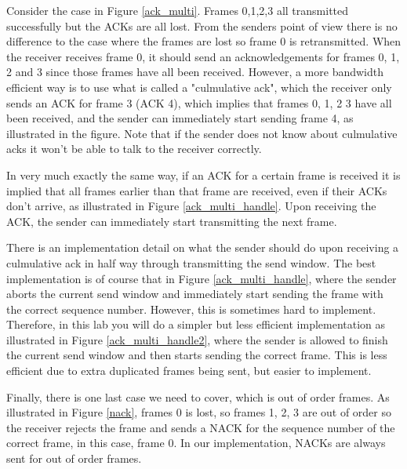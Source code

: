 \documentclass[11pt]{article}
\begin{document}
Consider the case in Figure \ref{ack_multi}. Frames 0,1,2,3 all transmitted successfully but the ACKs are all lost. From the senders point of view there is no difference to the case where the frames
are lost so frame 0 is retransmitted. When the receiver receives frame 0, it should send an acknowledgements for frames 0, 1, 2 and 3 since those frames have all been received. However, a more 
bandwidth efficient way is to use what is called a "culmulative ack", which the receiver only sends an ACK for frame 3 (ACK 4), which implies that frames 0, 1, 2 3 have all been received, and the sender
can immediately start sending frame 4, as illustrated in the figure. Note that if the sender does not know about culmulative acks it won't be able to talk to the receiver correctly.

In very much exactly the same way, if an ACK for a certain frame is received it is implied that all frames earlier than that frame are received, even if their ACKs don't arrive, as illustrated in Figure
\ref{ack_multi_handle}. Upon receiving the ACK, the sender can immediately start transmitting the next frame.

There is an implementation detail on what the sender should do upon receiving a culmulative ack in half way through transmitting the send window. The best implementation is of course that in Figure \ref{ack_multi_handle}, where
the sender aborts the current send window and immediately start sending the frame with the correct sequence number. However, this is sometimes hard to implement. Therefore, in this lab you will do a simpler but less efficient implementation
as illustrated in Figure \ref{ack_multi_handle2}, where the sender is allowed to finish the current send window and then starts sending the correct frame. This is less efficient due to extra duplicated frames being
sent, but easier to implement.

Finally, there is one last case we need to cover, which is out of order frames. As illustrated in Figure \ref{nack}, frames 0 is lost, so frames 1, 2, 3 are out of order so the receiver rejects the frame
and sends a NACK for the sequence number of the correct frame, in this case, frame 0. In our implementation, NACKs are always sent for out of order frames.
\end{document}

